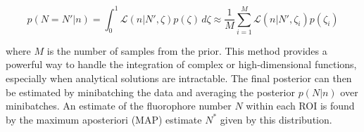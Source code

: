\begin{equation}
p(N=N'\lvert n) = \int_{0}^{1} \mathcal{L}(n\lvert N',\zeta) p(\zeta) \, d\zeta \approx \frac{1}{M} \sum_{i=1}^M \mathcal{L}(n\lvert N',\zeta_i) p(\zeta_i)
\end{equation}

where $M$ is the number of samples from the prior. This method provides a powerful way to handle the integration of complex or high-dimensional functions, especially when analytical solutions are intractable. The final posterior can then be estimated by minibatching the data and averaging the posterior $p(N\lvert n)$ over minibatches. An estimate of the fluorophore number $N$ within each ROI is found by the maximum aposteriori (MAP) estimate $N^{*}$ given by this distribution.







